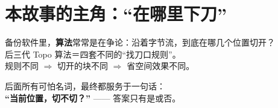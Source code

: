 \section{本故事的主角：``在哪里下刀''}

备份软件里，\textbf{算法}常常是在争论：沿着字节流，到底在哪几个位置切开？\\
后三代 Topo 算法＝四套不同的``找刀口规则''。\\
规则不同 $\Rightarrow$ 切开的块不同 $\Rightarrow$ 省空间效果不同。

\begin{keyidea}[你只要先记住这一点]
后面所有可怕名词，最终都服务于一句话：\\
\textbf{``当前位置，切不切？''} —— 答案只有是或否。
\end{keyidea}
